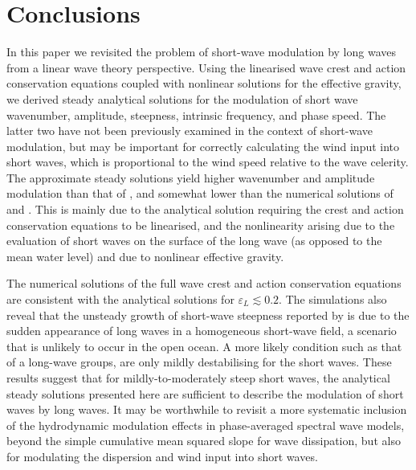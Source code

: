 \documentclass[lineno]{jfm}
\begin{document}
\section{Conclusions}
\label{section:conclusions}

In this paper we revisited the problem of short-wave modulation by long waves
from a linear wave theory perspective.
Using the linearised wave crest and action conservation equations coupled with
nonlinear solutions for the effective gravity, we derived steady analytical
solutions for the modulation of short wave wavenumber, amplitude, steepness,
intrinsic frequency, and phase speed.
The latter two have not been previously examined in the context of short-wave
modulation, but may be important for correctly calculating the wind input into
short waves, which is proportional to the wind speed relative to the wave
celerity.
The approximate steady solutions yield higher wavenumber and amplitude
modulation than that of \citet{longuet1960changes}, and somewhat lower than 
the numerical solutions of \citet{longuet1987propagation} and
\citet{zhang1990evolution}.
This is mainly due to the analytical solution requiring the crest and action
conservation equations to be linearised, and the nonlinearity arising due
to the evaluation of short waves on the surface of the long wave (as opposed to
the mean water level) and due to nonlinear effective gravity.

The numerical solutions of the full wave crest and action conservation equations
are consistent with the analytical solutions for $\varepsilon_L \lesssim 0.2$.
The simulations also reveal that the unsteady growth of short-wave steepness
reported by \citet{peureux2021unsteady} is due to the sudden appearance of
long waves in a homogeneous short-wave field, a scenario that is unlikely to
occur in the open ocean.
A more likely condition such as that of a long-wave groups, are only mildly
destabilising for the short waves.
These results suggest that for mildly-to-moderately steep short waves,
the analytical steady solutions presented here are sufficient to describe the
modulation of short waves by long waves.
It may be worthwhile to revisit a more systematic inclusion of the hydrodynamic
modulation effects in phase-averaged spectral wave models, beyond the simple
cumulative mean squared slope for wave dissipation, but also for modulating
the dispersion and wind input into short waves.

\end{document}

